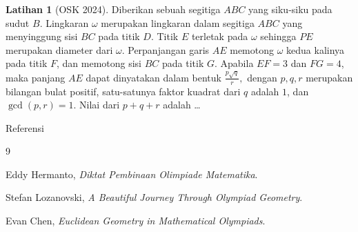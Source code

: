 ﻿\documentclass[aspectratio=169]{beamer}
\theoremstyle{definition}
\newtheorem{latihan}{Latihan}
\begin{document}
\begin{frame}{\insertsection}
  \begin{latihan}[OSK 2024]
    Diberikan sebuah segitiga $ABC$ yang siku-siku pada sudut $B$.
    Lingkaran $\omega$ merupakan lingkaran dalam segitiga $ABC$ yang
    menyinggung sisi $BC$ pada titik $D$. Titik $E$ terletak pada
    $\omega$ sehingga $PE$ merupakan diameter dari $\omega$.
    Perpanjangan garis $AE$ memotong $\omega$ kedua kalinya pada titik
    $F$, dan memotong sisi $BC$ pada titik $G$. Apabila $EF=3$ dan $FG=4$, maka panjang $AE$ dapat dinyatakan dalam bentuk
    $
      \frac{p\sqrt{q}}{r},
    $
    dengan $p,q,r$ merupakan bilangan bulat positif, satu-satunya faktor
    kuadrat dari $q$ adalah $1$, dan $\gcd(p,r)=1$. Nilai dari $p+q+r$ adalah \ldots
  \end{latihan}
\end{frame}

\begin{frame}{Referensi}
  \begin{thebibliography}{9}

    Eddy Hermanto,
    \emph{Diktat Pembinaan Olimpiade Matematika}.

    Stefan Lozanovski,
    \emph{A Beautiful Journey Through Olympiad Geometry}.

    Evan Chen,
    \emph{Euclidean Geometry in Mathematical Olympiads}.

  \end{thebibliography}
\end{frame}
\end{document}
